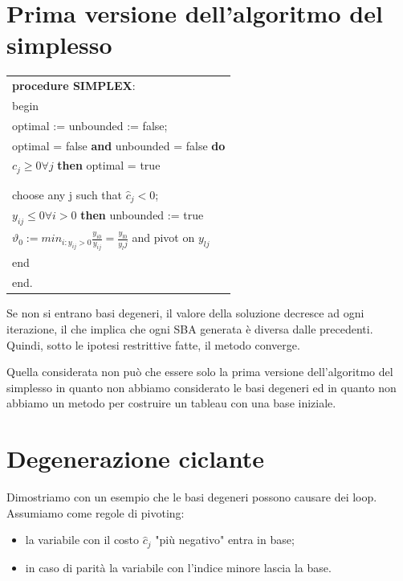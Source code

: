 \documentclass[11pt]{book}
\begin{document}
\section{Prima versione dell'algoritmo del simplesso}
\small
\begin{center}
\begin{tabular}{||l||}
\hline\hline
{\bf procedure SIMPLEX}:\\
begin\\
\phantom{aaa}optimal := unbounded := false;\\
\phantom{aaa}{\bf while} optimal = false {\bf and} unbounded = false {\bf do}\\
\phantom{aaaaaa}{\bf if} $c_j \geq 0 \forall j$ {\bf then} optimal = true\\
\phantom{aaaaaa}{\bf else}\\
\phantom{aaaaaaaaa}{\bf begin}\\
\phantom{aaaaaaaaaaaa}choose any j such that $\hat{c}_j < 0$;\\
\phantom{aaaaaaaaaaaa}{\bf if} $y_{ij} \leq 0 \forall i > 0$ {\bf then} unbounded := true\\
\phantom{aaaaaaaaaaaa}{\bf else} $\vartheta_0 := min_{i:y_{ij}>0}
\frac{y_{i0}}{y_{ij}} = \frac{y_{l0}}{y_lj}$ and pivot on $y_{lj}$\\
\phantom{aaa}end\\
end.\\
\hline\hline
\end{tabular}
\end{center}
\normalsize

Se non si entrano basi degeneri, il valore della soluzione decresce ad
ogni iterazione, il che implica che ogni SBA generata \`e diversa
dalle precedenti. Quindi, sotto le ipotesi restrittive fatte, il
metodo converge.

Quella considerata non pu\`o che essere solo la prima versione
dell'algoritmo del simplesso in quanto non abbiamo considerato le basi
degeneri ed in quanto non abbiamo un metodo per costruire un tableau
con una base iniziale.

\section{Degenerazione ciclante}

Dimostriamo con un esempio che le basi degeneri possono causare dei
loop. Assumiamo come regole di pivoting:

\begin{itemize}
  
\item la variabile con il costo $\hat{c}_j$ "pi\`u negativo" entra in
  base;
\item in caso di parit\`a la variabile con l'indice minore lascia la
  base.

\end{itemize}
\end{document}
